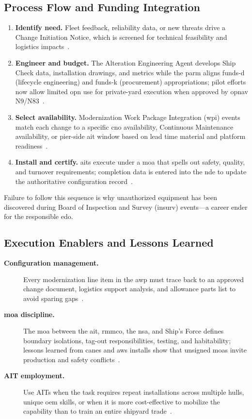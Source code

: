 \documentclass[../main.tex]{subfiles}
\begin{document}
\subsection{Process Flow and Funding Integration}
\begin{enumerate}
  \item \textbf{Identify need.} Fleet feedback, reliability data, or new threats drive a Change Initiation Notice, which is screened for technical feasibility and logistics impacts~\autocite{edo-4-1-2-navy-modernization-2025}.
  \item \textbf{Engineer and budget.} The Alteration Engineering Agent develops Ship Check data, installation drawings, and metrics while the \ac{parm} aligns \ac{funds-d} (lifecycle engineering) and \ac{funds-k} (procurement) appropriations; pilot efforts now allow limited \ac{opn} use for private-yard execution when approved by \ac{opnav} N9/N83~\autocite{edo-4-1-2-navy-modernization-2025,SL720-AA-MAN-030}.
  \item \textbf{Select availability.} Modernization Work Package Integration (\ac{wpi}) events match each change to a specific \ac{cno} availability, Continuous Maintenance availability, or pier-side \ac{ait} window based on lead time material and platform readiness~\autocite{TS9090-310}.
  \item \textbf{Install and certify.} \acp{ait} execute under a \ac{moa} that spells out safety, quality, and turnover requirements; completion data is entered into the \ac{nde} to update the authoritative configuration record~\autocite{SL720-AA-MAN-030,TS9090-310}.
\end{enumerate}
Failure to follow this sequence is why unauthorized equipment has been discovered during Board of Inspection and Survey (\ac{insurv}) events---a career ender for the responsible \ac{edo}.

\subsection{Execution Enablers and Lessons Learned}
\begin{description}
  \item[\textbf{Configuration management.}] Every modernization line item in the \ac{awp} must trace back to an approved change document, logistics support analysis, and allowance parts list to avoid sparing gaps~\autocite{COMFLTFORCOMINST4790-3}.
  \item[\textbf{\ac{moa} discipline.}] The \ac{moa} between the \ac{ait}, \ac{rmmco}, the \ac{nsa}, and Ship's Force defines boundary isolations, tag-out responsibilities, testing, and habitability; lessons learned from \ac{canes} and \ac{aws} installs show that unsigned \acp{moa} invite production and safety conflicts~\autocite{TS9090-310,edo-4-1-2-navy-modernization-2025}.
  \item[\textbf{AIT employment.}] Use AITs when the task requires repeat installations across multiple hulls, unique \ac{oem} skills, or when it is more cost-effective to mobilize the capability than to train an entire shipyard trade~\autocite{SL720-AA-MAN-030}.
\end{description}

\end{document}
